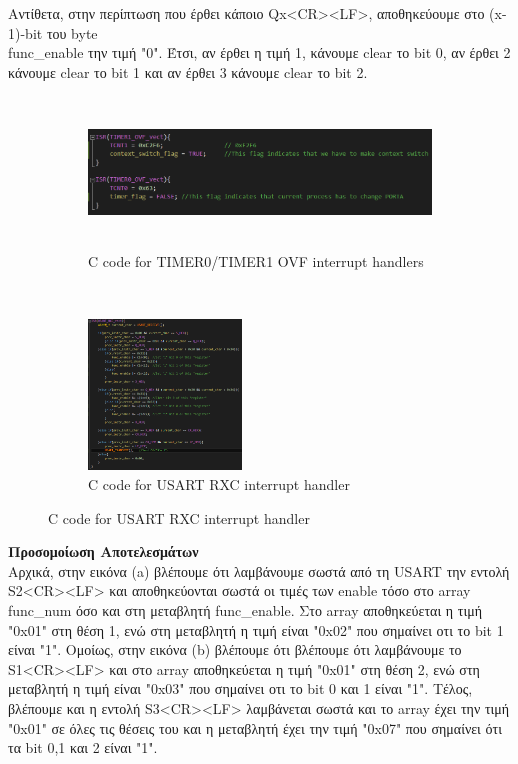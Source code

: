 \documentclass{article}
\begin{document}
	 \noindent
	 Aντίθετα, στην περίπτωση που έρθει κάποιο Qx<CR><LF>, αποθηκεύουμε στο (x-1)-bit του byte \\ func\_enable την τιμή "0". Έτσι, αν έρθει η τιμή 1, κάνουμε clear το bit 0, αν έρθει 2 κάνουμε clear το bit 1 και αν έρθει 3 κάνουμε clear το bit 2. \\
	\begin{figure}[h!]
		\centering
		\begin{subfigure}[t]{0.5\textwidth}
			\centering
			\includegraphics[height=4cm, width=\linewidth]{./results/lab8_timer_handlers.png}
			\caption{C code for TIMER0/TIMER1 OVF interrupt handlers}
		\end{subfigure}%
		~
		\begin{subfigure}[t]{0.5\textwidth}
			\centering
			\includegraphics[height=4cm, width=\linewidth]{./results/lab8_usart_handler.png}
			\caption{C code for USART RXC interrupt handler}
		\end{subfigure}
	\end{figure}
	
	\pagebreak
	\noindent
	\textbf{Προσομοίωση Αποτελεσμάτων} \\
	\noindent
	Aρχικά, στην εικόνα (a) βλέπουμε ότι λαμβάνουμε σωστά από τη USART την εντολή S2<CR><LF> και αποθηκεύονται σωστά οι τιμές των enable τόσο στο array func\_num όσο και στη μεταβλητή func\_enable. Στο array αποθηκεύεται η τιμή "0x01" στη θέση 1, ενώ στη μεταβλητή η τιμή είναι "0x02" που σημαίνει οτι το bit 1 είναι "1". Oμοίως, στην εικόνα (b) βλέπουμε ότι βλέπουμε ότι λαμβάνουμε το S1<CR><LF> και στο array αποθηκεύεται η τιμή "0x01" στη θέση 2, ενώ στη μεταβλητή η τιμή είναι "0x03" που σημαίνει οτι το bit 0 και 1 είναι "1". Τέλος, βλέπουμε και η εντολή S3<CR><LF> λαμβάνεται σωστά και το array έχει την τιμή "0x01" σε όλες τις θέσεις του και η μεταβλητή έχει την τιμή "0x07" που σημαίνει ότι τα bit 0,1 και 2 είναι "1".\\
	
\end{document}
